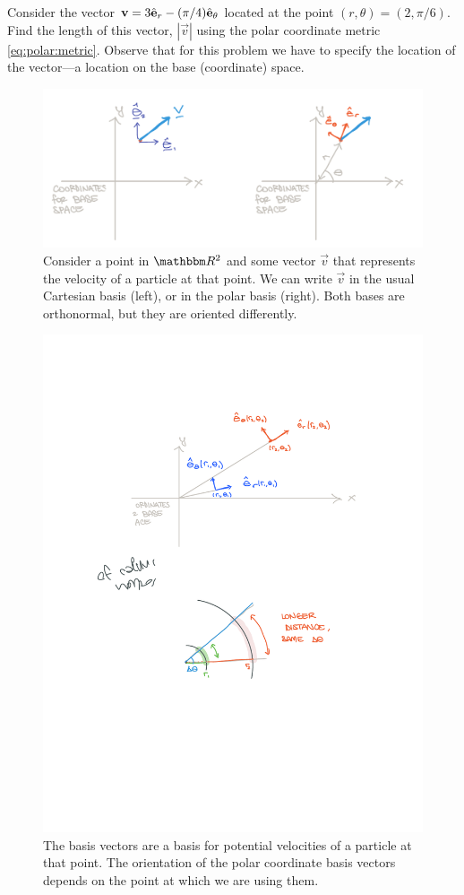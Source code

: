 \documentclass[12pt, oneside]{report}    %
\begin{document}
\begin{exercise}\label{ex:polar:location:dependence}
Consider the vector $\mathbf{v} = 3\hat{\mathbf{e}}_r - (\pi/4)\hat{\mathbf{e}}_\theta$ located at the point $(r,\theta)=(2, \pi/6)$. Find the length of this vector, $|\vec{v}|$ using the polar coordinate metric \eqref{eq:polar:metric}. Observe that for this problem we have to specify the location of the vector---a location on the base (coordinate) space. 
\end{exercise}



\begin{figure}[tb]
    \centering
    \includegraphics[width=.8\textwidth]{figures/PolarBasis.pdf}
    \caption{Consider a point in $\RR^2$ and some vector $\vec{v}$ that represents the velocity of a particle at that point. We can write $\vec{v}$ in the usual Cartesian basis (left), or in the polar basis (right). Both bases are orthonormal, but they are oriented differently.}
    \label{fig:polar:coordinate:vs:vector:space}
\end{figure}


\begin{figure}[tb]
    \centering
    \includegraphics[width=.6\textwidth]{figures/polar_different_orientation.pdf}
    \caption{The basis vectors are a basis for potential velocities of a particle at that point. The orientation of the polar coordinate basis vectors depends on the point at which we are using them. }
    \label{fig:polar:coordinate:vs:vector:space:two:points}
\end{figure}
\end{document}
